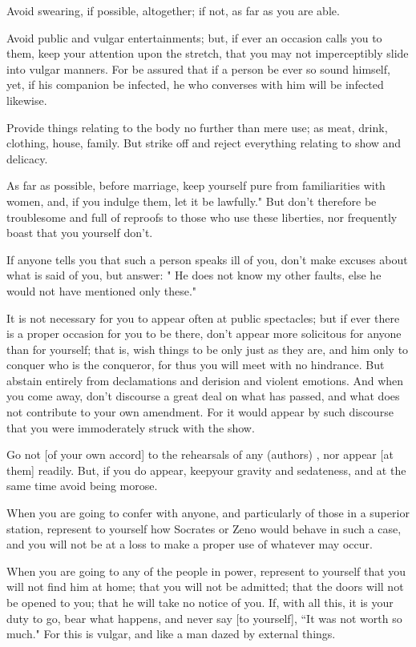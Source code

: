 \documentclass[a4paper,12pt]{book}
\begin{document}
Avoid swearing, if possible, altogether; if not, as far as you are
able. 

Avoid public and vulgar entertainments; but, if ever an occasion calls
you to them, keep your attention upon the stretch, that you may not
imperceptibly slide into vulgar manners. For be assured that if a
person be ever so sound himself, yet, if his companion be infected,
he who converses with him will be infected likewise. 

Provide things relating to the body no further than mere use; as meat,
drink, clothing, house, family. But strike off and reject everything
relating to show and delicacy. 

As far as possible, before marriage, keep yourself pure from familiarities
with women, and, if you indulge them, let it be lawfully." But don't
therefore be troublesome and full of reproofs to those who use these
liberties, nor frequently boast that you yourself don't.

If anyone tells you that such a person speaks ill of you, don't make
excuses about what is said of you, but answer: " He does not know
my other faults, else he would not have mentioned only these."

It is not necessary for you to appear often at public spectacles;
but if ever there is a proper occasion for you to be there, don't
appear more solicitous for anyone than for yourself; that is, wish
things to be only just as they are, and him only to conquer who is
the conqueror, for thus you will meet with no hindrance. But abstain
entirely from declamations and derision and violent emotions. And
when you come away, don't discourse a great deal on what has passed,
and what does not contribute to your own amendment. For it would appear
by such discourse that you were immoderately struck with the show.

Go not [of your own accord] to the rehearsals of any 
(authors) , nor appear [at them] readily. But, if you do appear, keepyour
gravity and sedateness, and at the same time avoid being morose.

When you are going to confer with anyone, and particularly of those
in a superior station, represent to yourself how Socrates or Zeno
would behave in such a case, and you will not be at a loss to make
a proper use of whatever may occur. 

When you are going to any of the people in power, represent to yourself
that you will not find him at home; that you will not be admitted;
that the doors will not be opened to you; that he will take no notice
of you. If, with all this, it is your duty to go, bear what happens,
and never say [to yourself], ``It was not worth so much." For this
is vulgar, and like a man dazed by external things. 
\end{document}
